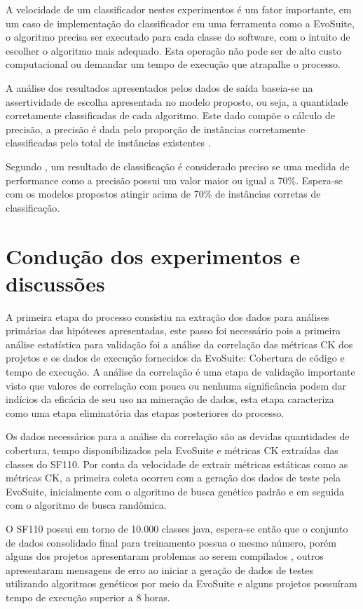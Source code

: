 \documentclass[
	12pt,				%
	oneside,			%
	a4paper,			%
	english,			%
	brazil				%
	]{abntex2ppgsi}
\begin{document}
A velocidade de um classificador nestes experimentos é um fator importante, em um caso de implementação do classificador em uma ferramenta como a EvoSuite, o algoritmo precisa ser executado para cada classe do software, com o intuito de escolher o algoritmo mais adequado. Esta operação não pode ser de alto custo computacional ou demandar um tempo de execução que atrapalhe o processo.

A análise dos resultados apresentados pelos dados de saída baseia-se na assertividade de escolha apresentada no modelo proposto, ou seja, a quantidade corretamente classificadas de cada algoritmo. Este dado compõe o cálculo de precisão, a precisão é dada pelo proporção de instâncias corretamente classificadas pelo total de instâncias existentes \cite{Kaur2014}.

Segundo \cite{Kaur2014}, um resultado de classificação é considerado preciso se uma medida de performance como a precisão possui um valor maior ou igual a 70\%. Espera-se com os modelos propostos atingir acima de 70\% de instâncias corretas de classificação.



 \chapter{Condução dos experimentos e discussões}
  A primeira etapa do processo consistiu na  extração dos dados para análises primárias das hipóteses apresentadas, este passo foi necessário pois a primeira análise estatística  para validação foi a análise da correlação das métricas CK dos projetos e os dados de execução fornecidos da EvoSuite: Cobertura de código e tempo de execução. A análise da correlação é uma etapa de validação importante visto que valores de correlação com pouca ou nenhuma significância podem dar indícios da eficácia de seu uso na mineração de dados, esta etapa caracteriza como uma etapa eliminatória das etapas posteriores do processo. 
  
 Os dados necessários para a análise da correlação são as devidas quantidades de cobertura, tempo disponibilizados pela EvoSuite e métricas CK extraídas das classes do SF110. Por conta da velocidade de extrair métricas estáticas como as métricas CK, a primeira coleta ocorreu com a geração dos dados de teste pela EvoSuite, inicialmente com o algoritmo de busca genético padrão e em seguida com o algoritmo de busca randômica.
 
 O SF110 possui em torno de 10.000 classes java, espera-se então que o conjunto de dados consolidado final para treinamento possua o mesmo número, porém alguns dos projetos apresentaram problemas ao serem compilados , outros apresentaram mensagens de erro ao iniciar a geração de dados de testes utilizando algoritmos genéticos por meio da EvoSuite e alguns projetos possuíram tempo de execução superior a 8 horas.
\end{document}
